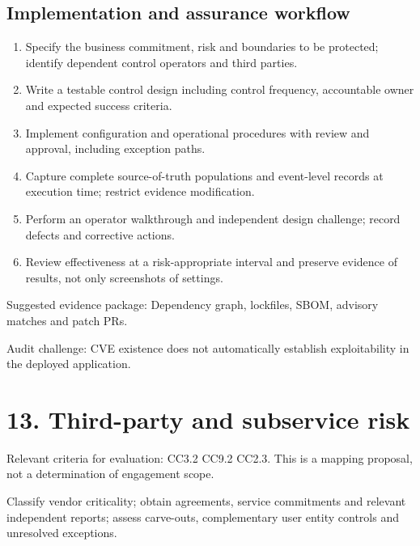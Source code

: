 \documentclass[10pt,oneside]{report}
\begin{document}
\subsection{Implementation and assurance workflow}
\begin{enumerate}
\item Specify the business commitment, risk and boundaries to be protected; identify dependent control operators and third parties.
\item Write a testable control design including control frequency, accountable owner and expected success criteria.
\item Implement configuration and operational procedures with review and approval, including exception paths.
\item Capture complete source-of-truth populations and event-level records at execution time; restrict evidence modification.
\item Perform an operator walkthrough and independent design challenge; record defects and corrective actions.
\item Review effectiveness at a risk-appropriate interval and preserve evidence of results, not only screenshots of settings.
\end{enumerate}

Suggested evidence package: Dependency graph, lockfiles, SBOM, advisory matches and patch PRs.

Audit challenge: CVE existence does not automatically establish exploitability in the deployed application.

\section{13. Third-party and subservice risk}
Relevant criteria for evaluation: CC3.2 CC9.2 CC2.3. This is a mapping proposal, not a determination of engagement scope.

\begin{engineeringbox}
Classify vendor criticality; obtain agreements, service commitments and relevant independent reports; assess carve-outs, complementary user entity controls and unresolved exceptions.
\end{engineeringbox}
\end{document}
